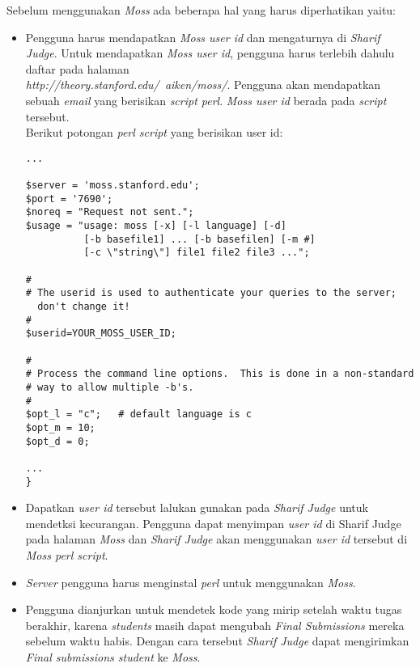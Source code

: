 Sebelum menggunakan \textit{Moss} ada beberapa hal yang harus diperhatikan yaitu:
\begin{itemize}
	\item Pengguna harus mendapatkan \textit{Moss user id} dan mengaturnya di \textit{Sharif Judge}. Untuk mendapatkan \textit{Moss user id}, pengguna harus terlebih dahulu daftar pada halaman \\ \textit{http://theory.stanford.edu/~aiken/moss/}. Pengguna akan mendapatkan sebuah \textit{email} yang berisikan \textit{script perl}. \textit{Moss user id} berada pada \textit{script} tersebut. \\
	Berikut potongan \textit{perl script} yang berisikan user id:

\begin{lstlisting}[backgroundcolor = \color{lightgray}]
...

$server = 'moss.stanford.edu';
$port = '7690';
$noreq = "Request not sent.";
$usage = "usage: moss [-x] [-l language] [-d] 
		  [-b basefile1] ... [-b basefilen] [-m #] 
		  [-c \"string\"] file1 file2 file3 ...";

#
# The userid is used to authenticate your queries to the server; 
  don't change it!
#
$userid=YOUR_MOSS_USER_ID;

#
# Process the command line options.  This is done in a non-standard
# way to allow multiple -b's.
#
$opt_l = "c";   # default language is c
$opt_m = 10;
$opt_d = 0;

...
}

\end{lstlisting}

\item Dapatkan \textit{user id} tersebut lalukan gunakan pada \textit{Sharif Judge} untuk mendetksi kecurangan. Pengguna dapat menyimpan \textit{user id} di Sharif Judge pada halaman \textit{Moss} dan \textit{Sharif Judge} akan menggunakan \textit{user id} tersebut di \textit{Moss perl script}.

\item \textit{Server} pengguna harus menginstal \textit{perl} untuk menggunakan \textit{Moss}.

\item Pengguna dianjurkan untuk mendetek kode yang mirip setelah waktu tugas berakhir, karena \textit{students} masih dapat mengubah \textit{Final Submissions} mereka sebelum waktu habis. Dengan cara tersebut \textit{Sharif Judge} dapat mengirimkan \textit{Final submissions student} ke \textit{Moss}.
\end{itemize}
